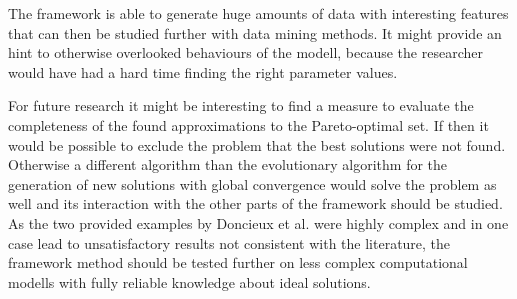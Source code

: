 \documentclass[12pt,twoside]{article}
\theoremstyle{plain}
\theoremstyle{definition}
\theoremstyle{remark}
\begin{document}
The framework is able to generate huge amounts of data with interesting features that can then be studied further with data mining methods.
It might provide an hint to otherwise overlooked behaviours of the modell, because the researcher would have had a hard time finding the right parameter values.\medskip

For future research it might be interesting to find a measure to evaluate the completeness of the found approximations to the Pareto-optimal set.
If then it would be possible to exclude the problem that the best solutions were not found. 
Otherwise a different algorithm than the evolutionary algorithm for the generation of new solutions with global convergence would solve the problem as well and its interaction with the other parts of the framework should be studied.\\
As the two provided examples by Doncieux et al. were highly complex and in one case lead to unsatisfactory results not consistent with the literature, the framework method should be tested further on less complex computational modells with fully reliable knowledge about ideal solutions.

%
%
\newpage


\end{document}
